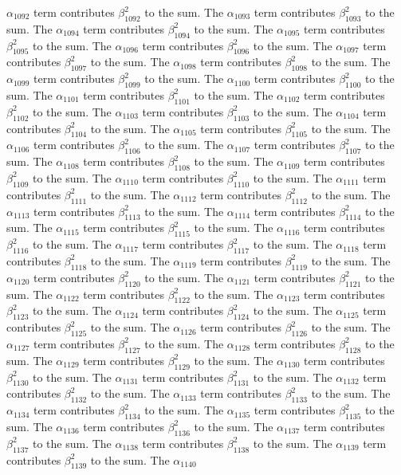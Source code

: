 \begin{lemma}
$\alpha_{1092}$ term contributes $\beta_{1092}^{2}$ to the sum. The $\alpha_{1093}$ term contributes $\beta_{1093}^{2}$ to the sum. The $\alpha_{1094}$ term contributes $\beta_{1094}^{2}$ to the sum. The $\alpha_{1095}$ term contributes $\beta_{1095}^{2}$ to the sum. The $\alpha_{1096}$ term contributes $\beta_{1096}^{2}$ to the sum. The $\alpha_{1097}$ term contributes $\beta_{1097}^{2}$ to the sum. The $\alpha_{1098}$ term contributes $\beta_{1098}^{2}$ to the sum. The $\alpha_{1099}$ term contributes $\beta_{1099}^{2}$ to the sum. The $\alpha_{1100}$ term contributes $\beta_{1100}^{2}$ to the sum. The $\alpha_{1101}$ term contributes $\beta_{1101}^{2}$ to the sum. The $\alpha_{1102}$ term contributes $\beta_{1102}^{2}$ to the sum. The $\alpha_{1103}$ term contributes $\beta_{1103}^{2}$ to the sum. The $\alpha_{1104}$ term contributes $\beta_{1104}^{2}$ to the sum. The $\alpha_{1105}$ term contributes $\beta_{1105}^{2}$ to the sum. The $\alpha_{1106}$ term contributes $\beta_{1106}^{2}$ to the sum. The $\alpha_{1107}$ term contributes $\beta_{1107}^{2}$ to the sum. The $\alpha_{1108}$ term contributes $\beta_{1108}^{2}$ to the sum. The $\alpha_{1109}$ term contributes $\beta_{1109}^{2}$ to the sum. The $\alpha_{1110}$ term contributes $\beta_{1110}^{2}$ to the sum. The $\alpha_{1111}$ term contributes $\beta_{1111}^{2}$ to the sum. The $\alpha_{1112}$ term contributes $\beta_{1112}^{2}$ to the sum. The $\alpha_{1113}$ term contributes $\beta_{1113}^{2}$ to the sum. The $\alpha_{1114}$ term contributes $\beta_{1114}^{2}$ to the sum. The $\alpha_{1115}$ term contributes $\beta_{1115}^{2}$ to the sum. The $\alpha_{1116}$ term contributes $\beta_{1116}^{2}$ to the sum. The $\alpha_{1117}$ term contributes $\beta_{1117}^{2}$ to the sum. The $\alpha_{1118}$ term contributes $\beta_{1118}^{2}$ to the sum. The $\alpha_{1119}$ term contributes $\beta_{1119}^{2}$ to the sum. The $\alpha_{1120}$ term contributes $\beta_{1120}^{2}$ to the sum. The $\alpha_{1121}$ term contributes $\beta_{1121}^{2}$ to the sum. The $\alpha_{1122}$ term contributes $\beta_{1122}^{2}$ to the sum. The $\alpha_{1123}$ term contributes $\beta_{1123}^{2}$ to the sum. The $\alpha_{1124}$ term contributes $\beta_{1124}^{2}$ to the sum. The $\alpha_{1125}$ term contributes $\beta_{1125}^{2}$ to the sum. The $\alpha_{1126}$ term contributes $\beta_{1126}^{2}$ to the sum. The $\alpha_{1127}$ term contributes $\beta_{1127}^{2}$ to the sum. The $\alpha_{1128}$ term contributes $\beta_{1128}^{2}$ to the sum. The $\alpha_{1129}$ term contributes $\beta_{1129}^{2}$ to the sum. The $\alpha_{1130}$ term contributes $\beta_{1130}^{2}$ to the sum. The $\alpha_{1131}$ term contributes $\beta_{1131}^{2}$ to the sum. The $\alpha_{1132}$ term contributes $\beta_{1132}^{2}$ to the sum. The $\alpha_{1133}$ term contributes $\beta_{1133}^{2}$ to the sum. The $\alpha_{1134}$ term contributes $\beta_{1134}^{2}$ to the sum. The $\alpha_{1135}$ term contributes $\beta_{1135}^{2}$ to the sum. The $\alpha_{1136}$ term contributes $\beta_{1136}^{2}$ to the sum. The $\alpha_{1137}$ term contributes $\beta_{1137}^{2}$ to the sum. The $\alpha_{1138}$ term contributes $\beta_{1138}^{2}$ to the sum. The $\alpha_{1139}$ term contributes $\beta_{1139}^{2}$ to the sum. The $\alpha_{1140}$ 
\end{lemma}
